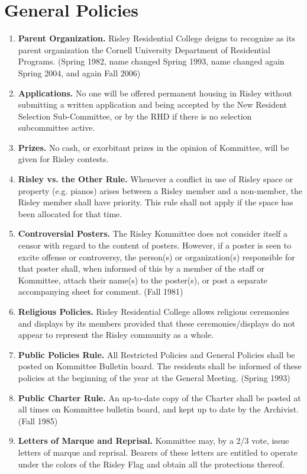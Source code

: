 \documentclass[12pt]{article}
\begin{document}
\section*{General Policies}
\begin{enumerate}[1.]
\item \textbf{Parent Organization.} Risley Residential College deigns to recognize as its parent organization the Cornell University Department of Residential Programs. (Spring 1982, name changed Spring 1993, name changed again Spring 2004, and again Fall 2006)

\item \textbf{Applications.} No one will be offered permanent housing in Risley without submitting a written application and being accepted by the New Resident Selection Sub-Committee, or by the RHD if there is no selection subcommittee active.
\item \textbf{Prizes.} No cash, or exorbitant prizes in the opinion of Kommittee, will be given for Risley contests.
\item \textbf{Risley vs. the Other Rule.} Whenever a conflict in use of Risley space or property (e.g. pianos) arises between a Risley member and a non-member, the Risley member shall have priority. This rule shall not apply if the space has been allocated for that time.
\item \textbf{Controversial Posters.} The Risley Kommittee does not consider itself a censor with regard to the content of posters. However, if a poster is seen to excite offense or controversy, the person(s) or organization(s) responsible for that poster shall, when informed of this by a member of the staff or Kommittee, attach their name(s) to the poster(s), or post a separate accompanying sheet for comment. (Fall 1981)
\item \textbf{Religious Policies.} Risley Residential College allows religious ceremonies and displays by its members provided that these ceremonies/displays do not appear to represent the Risley community as a whole.
\item \textbf{Public Policies Rule.} All Restricted Policies and General Policies shall be posted on Kommittee Bulletin board. The residents shall be informed of these policies at the beginning of the year at the General Meeting. (Spring 1993)
\item \textbf{Public Charter Rule.} An up-to-date copy of the Charter shall be posted at all times on Kommittee bulletin board, and kept up to date by the Archivist. (Fall 1985)
\item \textbf{Letters of Marque and Reprisal.} Kommittee may, by a 2/3 vote, issue letters of marque and reprisal. Bearers of these letters are entitled to operate under the colors of the Risley Flag and obtain all the protections thereof.

\end{enumerate}
\end{document}
